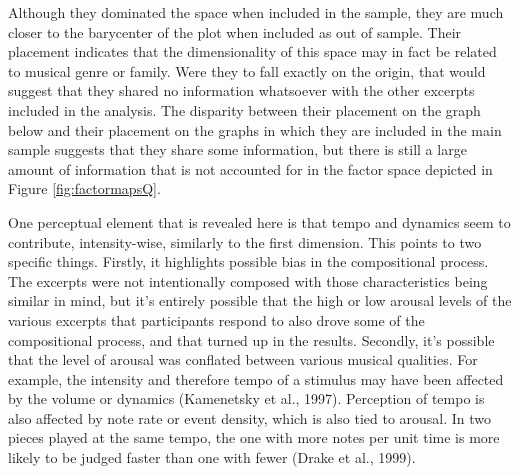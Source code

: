 \documentclass[
  english,
  man,floatsintext]{apa6}
\begin{document}
Although they dominated the space when included in the sample, they are much closer to the barycenter of the plot when included as out of sample. Their placement indicates that the dimensionality of this space may in fact be related to musical genre or family. Were they to fall exactly on the origin, that would suggest that they shared no information whatsoever with the other excerpts included in the analysis. The disparity between their placement on the graph below and their placement on the graphs in which they are included in the main sample suggests that they share some information, but there is still a large amount of information that is not accounted for in the factor space depicted in Figure \ref{fig:factormapsQ}.

One perceptual element that is revealed here is that tempo and dynamics seem to contribute, intensity-wise, similarly to the first dimension. This points to two specific things. Firstly, it highlights possible bias in the compositional process. The excerpts were not intentionally composed with those characteristics being similar in mind, but it's entirely possible that the high or low arousal levels of the various excerpts that participants respond to also drove some of the compositional process, and that turned up in the results. Secondly, it's possible that the level of arousal was conflated between various musical qualities. For example, the intensity and therefore tempo of a stimulus may have been affected by the volume or dynamics (Kamenetsky et al., 1997). Perception of tempo is also affected by note rate or event density, which is also tied to arousal. In two pieces played at the same tempo, the one with more notes per unit time is more likely to be judged faster than one with fewer (Drake et al., 1999).
\end{document}
